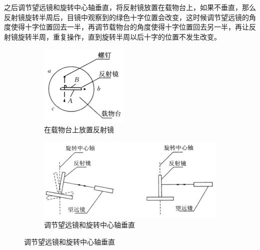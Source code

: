 \documentclass{article}
\begin{document}
之后调节望远镜和旋转中心轴垂直，将反射镜放置在载物台上，如果不垂直，那么反射镜旋转半周后，目镜中观察到的绿色十字位置会改变，这时候调节望远镜的角度使得十字位置回去一半，再调节载物台的角度使得十字位置回去另一半，再让反射镜旋转半周，重复操作，直到旋转半周以后十字的位置不发生改变。

\begin{figure}[H]
  \centering
  \begin{subfigure}{.3\textwidth}
    \centering
    \includegraphics[width=\linewidth]{figures/在载物台上放置反射镜}
    \caption{在载物台上放置反射镜}
  \end{subfigure}
  \begin{subfigure}{.6\textwidth}
    \centering
    \includegraphics[width=\linewidth]{figures/调节望远镜和旋转中心轴垂直}
    \caption{调节望远镜和旋转中心轴垂直}
  \end{subfigure}
\end{figure}
\end{document}
